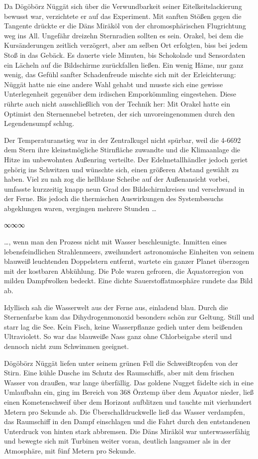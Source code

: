 Da Dögöbörz Nüggät sich über die Verwundbarkeit seiner Eitelkeitslackierung bewusst war, verzichtete er auf das Experiment. Mit sanften Stößen gegen die Tangente drückte er die Däns Miräköl von der chromosphärischen Flugrichtung weg ins All. Ungefähr dreizehn Sternradien sollten es sein. Orakel, bei dem die Kursänderungen zeitlich verzögert, aber am selben Ort erfolgten, biss bei jedem Stoß in das Gebäck. Es dauerte viele Minuten, bis Schokolade und Sensordaten ein Lächeln auf die Bildschirme zurückfallen ließen. Ein wenig Häme, nur ganz wenig, das Gefühl sanfter Schadenfreude mischte sich mit der Erleichterung: Nüggät hatte nie eine andere Wahl gehabt und musste sich eine gewisse Unterlegenheit gegenüber dem irdischen Emporkömmling eingestehen. Diese rührte auch nicht ausschließlich von der Technik her: Mit Orakel hatte ein Optimist den Sternennebel betreten, der sich unvoreingenommen durch den Legendensumpf schlug.

Der Temperaturanstieg war in der Zentralkugel nicht spürbar, weil die 4-6692 dem Stern ihre kleinstmögliche Stirnfläche zuwandte und die Klimaanlage die Hitze im unbewohnten Außenring verteilte. Der Edelmetallhändler jedoch geriet gehörig ins Schwitzen und wünschte sich, einen größeren Abstand gewählt zu haben. Viel zu nah zog die hellblaue Scheibe auf der Außenansicht vorbei, umfasste kurzzeitig knapp neun Grad des Bildschirmkreises und verschwand in der Ferne. Bis jedoch die thermischen Auswirkungen des Systembesuchs abgeklungen waren, vergingen mehrere Stunden …

\begin{center}
∞∞∞
\end{center}

…, wenn man den Prozess nicht mit Wasser beschleunigte. Inmitten eines lebensfeindlichen Strahlenmeers, zweihundert astronomische Einheiten von seinem blauweiß leuchtenden Doppelstern entfernt, wartete ein ganzer Planet überzogen mit der kostbaren Abkühlung. Die Pole waren gefroren, die Äquatorregion von milden Dampfwolken bedeckt. Eine dichte Sauerstoffatmosphäre rundete das Bild ab.

Idyllisch sah die Wasserwelt aus der Ferne aus, einladend blau. Durch die Sternenfarbe kam das Dihydrogenmonoxid besonders schön zur Geltung. Still und starr lag die See. Kein Fisch, keine Wasserpflanze gedieh unter dem beißenden Ultraviolett. So war das blauweiße Nass ganz ohne Chlorbeigabe steril und dennoch nicht zum Schwimmen geeignet.

Dögöbörz Nüggät liefen unter seinem grünen Fell die Schweißtropfen von der Stirn. Eine kühle Dusche im Schutz des Raumschiffs, aber mit dem frischen Wasser von draußen, war lange überfällig. Das goldene Nugget fädelte sich in eine Umlaufbahn ein, ging im Bereich von 368 Örztemp über dem Äquator nieder, ließ einen Kometenschweif über dem Horizont aufblitzen und tauchte mit vierhundert Metern pro Sekunde ab. Die Überschalldruckwelle ließ das Wasser verdampfen, das Raumschiff in den Dampf einschlagen und die Fahrt durch den entstandenen Unterdruck von hinten stark abbremsen. Die Däns Miräköl war unterwasserfähig und bewegte sich mit Turbinen weiter voran, deutlich langsamer als in der Atmosphäre, mit fünf Metern pro Sekunde.

